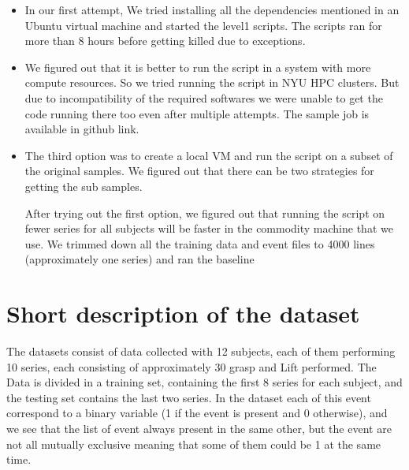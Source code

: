 \documentclass[final,leqno,onefignum,onetabnum]{siamltexmm}
\begin{document}
\begin{itemize}
  \item In our first attempt, We tried installing all the dependencies mentioned in an Ubuntu virtual machine and started the level1 scripts.  The scripts ran for more than 8 hours before getting killed due to exceptions.
  \item We figured out that it is better to run the script in a system with more compute resources.  So we tried running the script in NYU HPC clusters.  But due to incompatibility of the required softwares we were unable to get the code running there too even after multiple attempts.  The sample job is available in github link\cite{hpcjob}.
  \item The third option was to create a local VM and run the script on a subset of the original samples.  We figured out that there can be two strategies for getting the sub samples.  
    After trying out the first option, we figured out that running the script on fewer series for all subjects will be faster in the commodity machine that we use.  We trimmed down all the training data and event files to 4000 lines (approximately one series) and ran the baseline
\end{itemize}

\section{Short description of the dataset}
The  datasets consist of data collected with 12 subjects, each of them performing 10 series, each consisting of approximately 30 grasp and Lift performed. The Data is divided in a  training set, containing the first 8 series for each subject, and  the testing set contains the last two series.
In the dataset each of this event correspond to a binary variable (1 if the event is present and 0 otherwise), and we see that the list of event always present in the same other, but the event are not all mutually exclusive meaning that some of  them could be 1 at the same time.  
\end{document}
